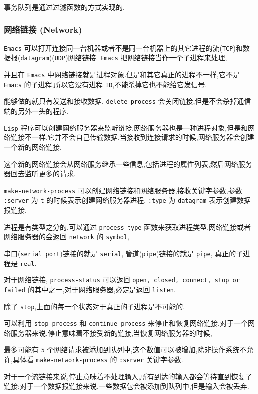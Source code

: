 \documentclass[11pt]{article}
\begin{document}
事务队列是通过过滤函数的方式实现的.



\subsubsection{网络链接 (Network)}
\label{sec:orgb06a2e8}

\texttt{Emacs} 可以打开连接同一台机器或者不是同一台机器上的其它进程的流(\texttt{TCP})和数据报(\texttt{datagram})(\texttt{UDP})网络链接. \texttt{Emacs} 把网络链接当作一个子进程来处理,

并且在 \texttt{Emacs} 中网络链接就是进程对象.但是和其它真正的进程不一样,它不是 \texttt{Emacs} 的子进程,所以它没有进程 \texttt{ID},不能杀掉它也不能给它发信号.

能够做的就只有发送和接收数据. \texttt{delete-process} 会关闭链接,但是不会杀掉通信端的另外一头的程序.

\texttt{Lisp} 程序可以创建网络服务器来监听链接.网络服务器也是一种进程对象,但是和网络链接不一样,它并不会自己传输数据,当接收到连接请求的时候,网络服务器会创建一个新的网络链接,

这个新的网络链接会从网络服务继承一些信息,包括进程的属性列表,然后网络服务器回去监听更多的请求.

\texttt{make-network-process} 可以创建网络链接和网络服务器,接收关键字参数,参数 \texttt{:server} 为 \texttt{t} 的时候表示创建网络服务器进程, \texttt{:type} 为 \texttt{datagram} 表示创建数据报链接.

进程是有类型之分的,可以通过 \texttt{process-type} 函数来获取进程类型,网络链接或者网络服务器的会返回 \texttt{network} 的 \texttt{symbol},

串口(\texttt{serial port})链接的就是 \texttt{serial}, 管道(\texttt{pipe})链接的就是 \texttt{pipe}, 真正的子进程是 \texttt{real}.

对于网络链接, \texttt{process-status} 可以返回 \texttt{open, closed, connect, stop or failed} 的其中之一,对于网络服务器,必定是返回 \texttt{listen}.

除了 \texttt{stop},上面的每一个状态对于真正的子进程是不可能的.

可以利用 \texttt{stop-process} 和 \texttt{continue-process} 来停止和恢复网络链接,对于一个网络服务器来说,停止意味着不接受新的链接,当恢复网络服务器的时候,

最多可能有 \texttt{5} 个网络请求被添加到队列中,这个数值可以被增加,除非操作系统不允许,具体看 \texttt{make-network-process} 的 \texttt{:server} 关键字参数.

对于一个流链接来说,停止意味着不处理输入,所有到达的输入都会等待直到恢复了链接;对于一个数据报链接来说,一些数据包会被添加到队列中,但是输入会被丢弃.
\end{document}
